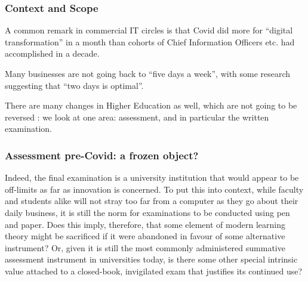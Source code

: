 \frame{
\titlepage
}
\begin{frame}[fragile]
\frametitle{Context and Scope}
\pause
A common remark in commercial IT circles is that Covid did more for ``digital transformation'' in a month than cohorts of Chief  Information Officers etc. had accomplished in a decade. 
\pause\par
 Many businesses are not going back to ``five days a week'', with some research \cite{Bindley2022a} suggesting that ``two days is optimal''.
\par\pause
There are many changes in Higher Education as well, which are not going to be reversed \cite{Crick2021a,Cricketal2020e}: we look at one area: assessment, and in particular the written examination.
\end{frame}
\begin{frame}[fragile]
\frametitle{Assessment pre-Covid: a frozen object?}
\pause
Indeed, the final examination is a university institution that would appear to be off-limits as far as innovation is concerned. To put this into context, while faculty and students alike will not stray too far from a computer as they go about their daily business, it is still the norm for examinations to be conducted using pen and paper. Does this imply, therefore, that some element of modern learning theory might be sacrificed if it were abandoned in favour of some alternative instrument? Or, given it is still the most commonly administered summative assessment instrument in universities today, is there some other special intrinsic value attached to a closed-book, invigilated exam that justifies its continued use?
\cite{WilliamsWong2009a}
\end{frame}

